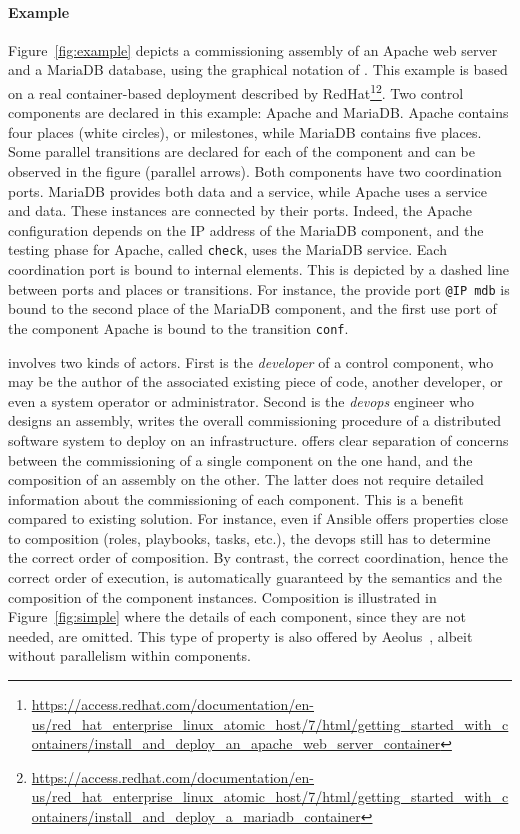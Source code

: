 \paragraph{Example}{
	Figure~\ref{fig:example} depicts a \mad commissioning assembly of an Apache 
	web server and a MariaDB database, using the graphical notation of \mad. 
	This example is based on a real container-based deployment described by 
	RedHat\footnote{\url{https://access.redhat.com/documentation/en-us/red_hat_enterprise_linux_atomic_host/7/html/getting_started_with_containers/install_and_deploy_an_apache_web_server_container}}\footnote{\url{https://access.redhat.com/documentation/en-us/red_hat_enterprise_linux_atomic_host/7/html/getting_started_with_containers/install_and_deploy_a_mariadb_container}}.
	 Two \mad control components are declared in this example: Apache and MariaDB. 
	Apache contains four places (white circles), or milestones, while MariaDB 
	contains five places. Some parallel transitions are declared for each of the 
	component and can be observed in the figure (parallel arrows). Both components 
	have two coordination ports. MariaDB provides both data and a service, while 
	Apache uses a service and data. These instances are connected by their ports. 
	Indeed, the Apache configuration depends on the IP address of the MariaDB 
	component, and the testing phase for Apache, called \texttt{check}, uses the 
	MariaDB service. Each coordination port is bound to internal elements. This is depicted by a dashed line between ports and places or transitions. For instance, the provide port \texttt{@IP mdb} is bound to the second place of the MariaDB component, and the first use port of the component Apache is bound to the transition \texttt{conf}.
} %

\mad involves two kinds of actors. First is the \emph{developer} of a
control component, who may be the author of the associated existing
piece of code, another developer, or even a system operator or
administrator. Second is the \emph{devops} engineer who designs an
assembly, \ie writes the overall commissioning procedure of a
distributed software system to deploy on an infrastructure. \mad
offers clear separation of concerns between the commissioning of a
single component on the one hand, and the composition of an assembly
on the other. The latter does not require detailed information about
the commissioning of each component. This is a benefit compared to
existing solution. For instance, even if Ansible offers properties
close to composition (\eg roles, playbooks, tasks, etc.), the devops
still has to determine the correct order of composition. By contrast,
the correct coordination, hence the correct order of execution, is
automatically guaranteed by the \mad semantics and the composition of
the component instances. Composition is illustrated in
Figure~\ref{fig:simple} where the details of each component, since
they are not needed, are omitted. This type of property is also
offered by Aeolus~\cite{dicosmo2014ic}, albeit without parallelism
within components.

